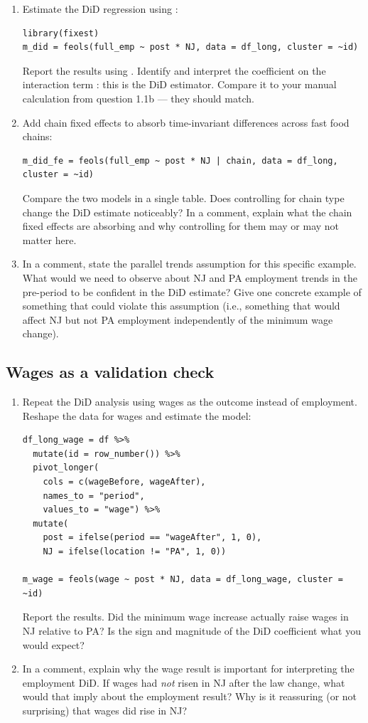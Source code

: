 \begin{enumerate}[label=\alph*)]
  \item Estimate the DiD regression using :
  \begin{lstlisting}
library(fixest)
m_did = feols(full_emp ~ post * NJ, data = df_long, cluster = ~id)
  \end{lstlisting}
  Report the results using . Identify and interpret the coefficient on the interaction term : this is the DiD estimator. Compare it to your manual calculation from question 1.1b --- they should match.
  \item Add chain fixed effects to absorb time-invariant differences across fast food chains:
  \begin{lstlisting}
m_did_fe = feols(full_emp ~ post * NJ | chain, data = df_long, cluster = ~id)
  \end{lstlisting}
  Compare the two models in a single  table. Does controlling for chain type change the DiD estimate noticeably? In a comment, explain what the chain fixed effects are absorbing and why controlling for them may or may not matter here.
  \item In a comment, state the parallel trends assumption for this specific example. What would we need to observe about NJ and PA employment trends in the pre-period to be confident in the DiD estimate? Give one concrete example of something that could violate this assumption (i.e., something that would affect NJ but not PA employment independently of the minimum wage change).
\end{enumerate}

\subsection{Wages as a validation check}

\begin{enumerate}[label=\alph*)]
  \item Repeat the DiD analysis using wages as the outcome instead of employment. Reshape the data for wages and estimate the model:
  \begin{lstlisting}
df_long_wage = df %>%
  mutate(id = row_number()) %>%
  pivot_longer(
    cols = c(wageBefore, wageAfter),
    names_to = "period",
    values_to = "wage") %>%
  mutate(
    post = ifelse(period == "wageAfter", 1, 0),
    NJ = ifelse(location != "PA", 1, 0))

m_wage = feols(wage ~ post * NJ, data = df_long_wage, cluster = ~id)
  \end{lstlisting}
  Report the results. Did the minimum wage increase actually raise wages in NJ relative to PA? Is the sign and magnitude of the DiD coefficient what you would expect?
  \item In a comment, explain why the wage result is important for interpreting the employment DiD. If wages had \textit{not} risen in NJ after the law change, what would that imply about the employment result? Why is it reassuring (or not surprising) that wages did rise in NJ?
\end{enumerate}

